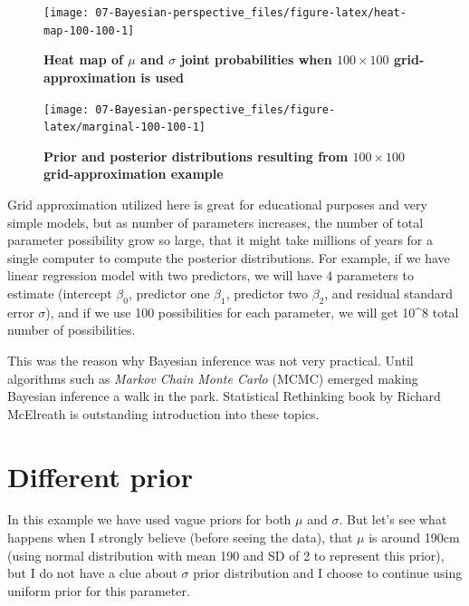 \documentclass[
]{book}
\begin{document}
\begin{figure}

{\centering \texttt{[image: 07-Bayesian-perspective\_files/figure-latex/heat-map-100-100-1]} 

}

\caption{\textbf{Heat map of \(\mu\) and \(\sigma\) joint probabilities when \(100\times 100\) grid-approximation is used}}\label{fig:heat-map-100-100}
\end{figure}



\begin{figure}

{\centering \texttt{[image: 07-Bayesian-perspective\_files/figure-latex/marginal-100-100-1]} 

}

\caption{\textbf{Prior and posterior distributions resulting from \(100\times 100\) grid-approximation example}}\label{fig:marginal-100-100}
\end{figure}



Grid approximation utilized here is great for educational purposes and very simple models, but as number of parameters increases, the number of total parameter possibility grow so large, that it might take millions of years for a single computer to compute the posterior distributions. For example, if we have linear regression model with two predictors, we will have 4 parameters to estimate (intercept \(\beta_{0}\), predictor one \(\beta_{1}\), predictor two \(\beta_{2}\), and residual standard error \(\sigma\)), and if we use 100 possibilities for each parameter, we will get 10\^{}8 total number of possibilities.

This was the reason why Bayesian inference was not very practical. Until algorithms such as \emph{Markov Chain Monte Carlo} (MCMC) emerged making Bayesian inference a walk in the park. Statistical Rethinking book by Richard McElreath is outstanding introduction into these topics.

\hypertarget{different-prior}{%
\section{Different prior}\label{different-prior}}

In this example we have used vague priors for both \(\mu\) and \(\sigma\). But let's see what happens when I strongly believe (before seeing the data), that \(\mu\) is around 190cm (using normal distribution with mean 190 and SD of 2 to represent this prior), but I do not have a clue about \(\sigma\) prior distribution and I choose to continue using uniform prior for this parameter.
\end{document}
